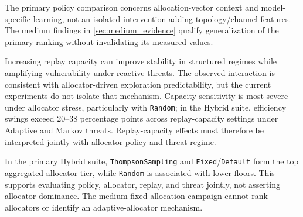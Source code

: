 
The primary policy comparison concerns allocation-vector context and model-specific learning, not an isolated intervention adding topology/channel features. The medium findings in \cref{sec:medium_evidence} qualify generalization of the primary ranking without invalidating its measured values.


Increasing replay capacity can improve stability in structured regimes while amplifying vulnerability under reactive threats. The observed interaction is consistent with allocator-driven exploration predictability, but the current experiments do not isolate that mechanism. Capacity sensitivity is most severe under allocator stress, particularly with \texttt{Random}; in the Hybrid suite, efficiency swings exceed 20--38 percentage points across replay-capacity settings under Adaptive and Markov threats. Replay-capacity effects must therefore be interpreted jointly with allocator policy and threat regime.


In the primary Hybrid suite, \texttt{ThompsonSampling} and \texttt{Fixed}/\texttt{Default} form the top aggregated allocator tier, while \texttt{Random} is associated with lower floors. This supports evaluating policy, allocator, replay, and threat jointly, not asserting allocator dominance. The medium fixed-allocation campaign cannot rank allocators or identify an adaptive-allocator mechanism.

